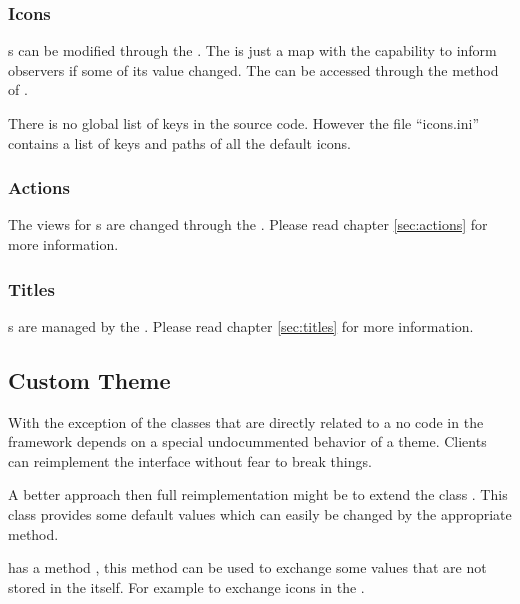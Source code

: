 \subsubsection{Icons}
s can be modified through the . The  is just a map with the capability to inform observers if some of its value changed. The  can be accessed through the method  of \linebreak {}.

There is no global list of keys in the source code. However the file ``icons.ini'' contains a list of keys and paths of all the default icons.

\subsubsection{Actions}
The views for s are changed through the . Please read chapter \ref{sec:actions} for more information.

\subsubsection{Titles}
s are managed by the . Please read chapter \ref{sec:titles} for more information.

\subsection{Custom Theme}
With the exception of the classes that are directly related to a  no code in the framework depends on a special undocummented behavior of a theme. Clients can reimplement the interface  without fear to break things.

A better approach then full reimplementation might be to extend the class . This class provides some default values which can easily be \linebreak changed by the appropriate  method.

 has a method , this method can be used to exchange some values that are not stored in the  itself. For example to exchange icons in the .

